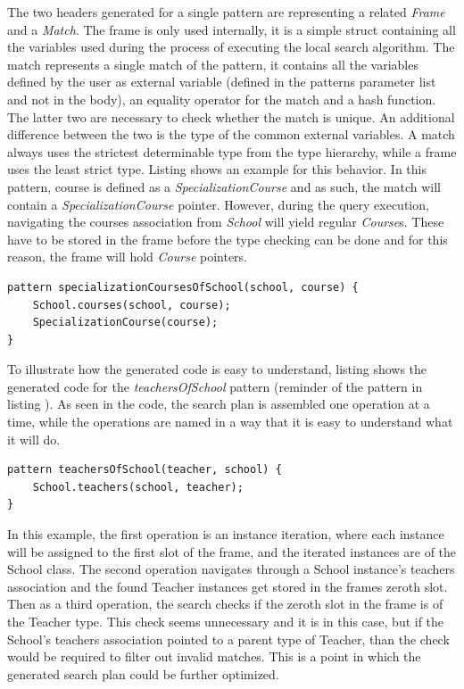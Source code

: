 The two headers generated for a single pattern are representing a related
\emph{Frame} and a \emph{Match}. The frame is only used internally, it is a
simple struct containing all the variables used during the process of
executing the local search algorithm. The match represents a single match of the
pattern, it contains all the variables defined by the user as external variable
(defined in the patterns parameter list and not in the body), an equality
operator for the match and a hash function. The latter two are necessary to
check whether the match is unique. An additional difference between the two is
the type of the common external variables. A match always uses the strictest
determinable type from the type hierarchy, while a frame uses the least strict
type. Listing  shows an example for this behavior. In
this pattern, course is defined as a \emph{SpecializationCourse} and as such,
the match will contain a \emph{SpecializationCourse} pointer. However, during
the query execution, navigating the courses association from \emph{School} will
yield regular \emph{Course}s. These have to be stored in the frame before the
type checking can be done and for this reason, the frame will hold
\emph{Course} pointers.

\begin{lstlisting}[frame=single,float=!ht,language=IQPL,
label=listing:tos_pattern_spec, caption=Specialization courses pattern] 
pattern specializationCoursesOfSchool(school, course) {
	School.courses(school, course);
	SpecializationCourse(course);
}
\end{lstlisting} 

To illustrate how the generated code is easy to understand, listing
 shows the generated code for the
\emph{teachersOfSchool} pattern (reminder of the pattern in listing
). As seen in the code, the search plan is assembled
one operation at a time, while the operations are named in a way that it is easy
to understand what it will do. 

\begin{lstlisting}[frame=single,float=!ht,language=IQPL,
label=listing:tos_pattern_rem, caption=Teachers of school pattern as a
reminder] 
pattern teachersOfSchool(teacher, school) {
	School.teachers(school, teacher); 
}
\end{lstlisting}

In this example, the first operation is an instance iteration, where each
instance will be assigned to the first slot of the frame, and the iterated
instances are of the School class. The second operation navigates through a
School instance's teachers association and the found Teacher instances get
stored in the frames zeroth slot. Then as a third operation, the search checks if the
zeroth slot in the frame is of the Teacher type. This check seems unnecessary
and it is in this case, but if the School's teachers association pointed to a
parent type of Teacher, than the check would be required to filter out invalid
matches. This is a point in which the generated search plan could be further
optimized.

